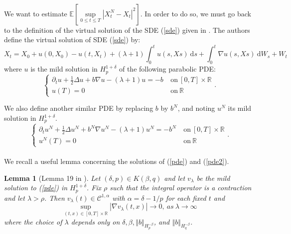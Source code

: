 \documentclass{article}[12pt]
\newtheorem{lem}[theo]{Lemma}
\newcommand{\norme}[1]{\left\Vert #1\right\Vert}
\newcommand{\R}{\mathbb{R}}
\newcommand{\E}{\mathbb{E}}
\newcommand{\di}{\mathrm{d}}
\begin{document}
        \paragraph{}
        We want to estimate $\E\left[\underset{0\leq t\leq T}{\sup}\left|X^{N}_t-X_t\right|^2\right]$. In order to do so, we must go back to the definition of the virtual solution of the SDE (\ref{sde}) given in \cite{Fla-Iss-Rus-2017}. The authors define the virtual solution of SDE (\ref{sde}) by:
        \begin{equation}
        X_t = X_0 + u(0,X_0) - u(t,X_t) + (\lambda+1)\int_0^t u(s,Xs)\ \di s +\int_0^t \nabla u(s,Xs)\ \di W_s + W_t
        \end{equation}
        where $u$ is the mild solution in $H_p^{1+\delta}$ of the following parabolic PDE:
        \begin{equation}\label{pde}
        \begin{cases}
        \partial_t u + \frac{1}{2}\Delta u + b\nabla u - (\lambda+1)u = -b\ &\mathrm{on}\ [0,T]\times\R\\
        u(T) = 0\ &\mathrm{on}\ \R
        \end{cases}.
        \end{equation}
        
        We also define another similar PDE by replacing $b$ by $b^N$, and noting $u^N$ its mild solution in $H_p^{1+\delta}$.
        \begin{equation}\label{pde2}
        \begin{cases}
        \partial_t u^N + \frac{1}{2}\Delta u^N + b^N\nabla u^N - (\lambda+1)u^N = -b^N\ &\mathrm{on}\ [0,T]\times\R\\
        u^N(T) = 0\ &\mathrm{on}\ \R
        \end{cases}.
        \end{equation}
        
        \paragraph{}              
        We recall a useful lemma concerning the solutions of (\ref{pde}) and (\ref{pde2}).
        
        \begin{lem}[Lemma 19 in \cite{Fla-Iss-Rus-2017}]\label{lem}
            Let $(\delta,p)\in K(\beta,q)$ and let $v_\lambda$ be the mild solution to (\ref{pde}) in $H_p^{1+\delta}$. Fix $\rho$ such that the integral operator is a contraction and let $\lambda>\rho$. Then $v_\lambda(t)\in\mathcal{C}^{1,\alpha}$ with $\alpha=\delta-1/p$ for each fixed $t$ and 
            \begin{equation}
            \underset{(t,x)\in[0,T]\times\R}{\sup} |\nabla v_\lambda(t,x)| \rightarrow 0,\ as\ \lambda \rightarrow \infty
            \end{equation}
            where the choice of $\lambda$ depends only on $\delta,\beta,\norme{b}_{H_p^{-\beta}}$, and $\norme{b}_{H_q^{-\beta}}$.
        \end{lem}
        
\end{document}
